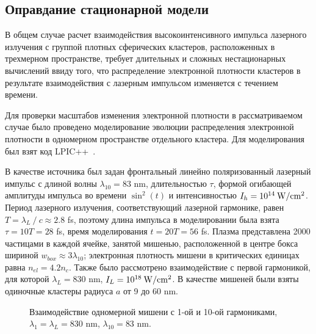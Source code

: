 \subsection{Оправдание стационарной модели}

В общем случае расчет взаимодействия высокоинтенсивного импульса лазерного излучения с группой плотных сферических кластеров, расположенных в трехмерном пространстве, требует длительных и сложных нестационарных вычислений ввиду того, что распределение электронной плотности кластеров в результате взаимодействия с лазерным импульсом изменяется с течением времени.

Для проверки масштабов изменения электронной плотности в рассматриваемом случае было проведено моделирование эволюции распределения электронной плотности в одномерном пространстве отдельного кластера. Для моделирования был взят код LPIC++~\cite{Pfund1998}.

В качестве источника был задан фронтальный линейно поляризованный лазерный импульс с длиной волны $\lambda_{10} = 83$ nm, длительностью $\tau$, формой огибающей амплитуды импульса во времени $\sin^2{(t)}$ и интенсивностью $I_{h} = 10^{14}\:\rm{W}/\rm{cm}^2$. Период лазерного излучения, соответствующий лазерной гармонике, равен $T = \lambda_{L}\:/\:c \approx 2.8$ fs, поэтому длина импульса в моделировании была взята $\tau = 10T = 28$ fs, время моделирования $t = 20T = 56$ fs. Плазма представлена 2000 частицами в каждой ячейке, занятой мишенью, расположенной в центре бокса шириной $w_{box} \approx 3\lambda_{10}$; электронная плотность мишени в критических единицах равна $n_{el} = 4.2 n_c$. Также было рассмотрено взаимодействие с первой гармоникой, для которой $\lambda_L = 830$ nm, $I_L = 10^{18}\:\rm{W}/\rm{cm}^2$. В качестве мишеней были взяты одиночные кластеры радиуса $a$ от 9 до 60 nm.




    \begin{figure}[htbp]
        \hfil
        \caption{Взаимодействие одномерной мишени с 1-ой и 10-ой гармониками, $\lambda_{1} = \lambda_{L} = 830$ nm, $\lambda_{10} = 83$ nm.}\label{lpic_low_high:image}
    \end{figure}

